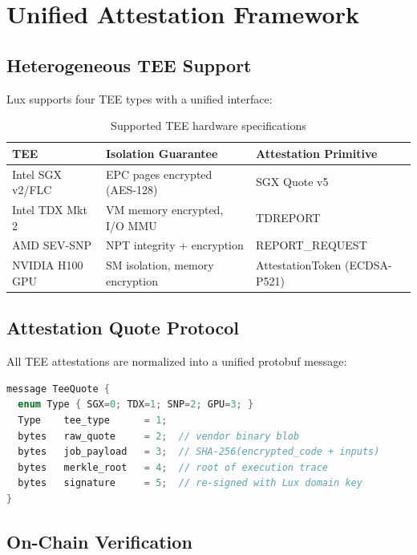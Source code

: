 \section{Unified Attestation Framework}

\label{sec:attestation}

\subsection{Heterogeneous TEE Support}

Lux supports four TEE types with a unified interface:

\begin{table}[h]
\centering
\begin{tabular}{@{}lll@{}}
\toprule
\textbf{TEE} & \textbf{Isolation Guarantee} & \textbf{Attestation Primitive} \\
\midrule
Intel SGX v2/FLC & EPC pages encrypted (AES-128) & SGX Quote v5 \\
Intel TDX Mkt 2 & VM memory encrypted, I/O MMU & TDREPORT \\
AMD SEV-SNP & NPT integrity + encryption & REPORT\_REQUEST \\
NVIDIA H100 GPU & SM isolation, memory encryption & AttestationToken (ECDSA-P521) \\
\bottomrule
\end{tabular}
\caption{Supported TEE hardware specifications}
\label{tab:tees}
\end{table}

\subsection{Attestation Quote Protocol}

All TEE attestations are normalized into a unified protobuf message:

\begin{lstlisting}[language=C,caption={Unified TeeQuote Protocol Buffer}]
message TeeQuote {
  enum Type { SGX=0; TDX=1; SNP=2; GPU=3; }
  Type    tee_type      = 1;
  bytes   raw_quote     = 2;  // vendor binary blob
  bytes   job_payload   = 3;  // SHA-256(encrypted_code + inputs)
  bytes   merkle_root   = 4;  // root of execution trace
  bytes   signature     = 5;  // re-signed with Lux domain key
}
\end{lstlisting}

\subsection{On-Chain Verification}

